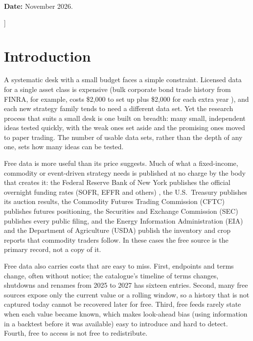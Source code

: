 \documentclass[10pt, a4paper, twocolumn]{article}
\begin{document}
{\begin{center}
\vspace{0.3em}
{\footnotesize \textbf{Date:} November 2026.}
\end{center}
\vspace{1em}
}]

\section{Introduction}
\label{sec:intro}

A systematic desk with a small budget faces a simple constraint. Licensed data for a single asset class is expensive (bulk corporate bond trade history from FINRA, for example, costs \$2,000 to set up plus \$2,000 for each extra year \cite{finra}), and each new strategy family tends to need a different data set. Yet the research process that suits a small desk is one built on breadth: many small, independent ideas tested quickly, with the weak ones set aside and the promising ones moved to paper trading. The number of usable data sets, rather than the depth of any one, sets how many ideas can be tested.

Free data is more useful than its price suggests. Much of what a fixed-income, commodity or event-driven strategy needs is published at no charge by the body that creates it: the Federal Reserve Bank of New York publishes the official overnight funding rates (SOFR, EFFR and others) \cite{nyfed}, the U.S.\ Treasury publishes its auction results, the Commodity Futures Trading Commission (CFTC) publishes futures positioning, the Securities and Exchange Commission (SEC) publishes every public filing, and the Energy Information Administration (EIA) and the Department of Agriculture (USDA) publish the inventory and crop reports that commodity traders follow. In these cases the free source is the primary record, not a copy of it.

Free data also carries costs that are easy to miss. First, endpoints and terms change, often without notice; the catalogue's timeline of terms changes, shutdowns and renames from 2025 to 2027 has sixteen entries. Second, many free sources expose only the current value or a rolling window, so a history that is not captured today cannot be recovered later for free. Third, free feeds rarely state when each value became known, which makes look-ahead bias (using information in a backtest before it was available) easy to introduce and hard to detect. Fourth, free to access is not free to redistribute.
\end{document}
